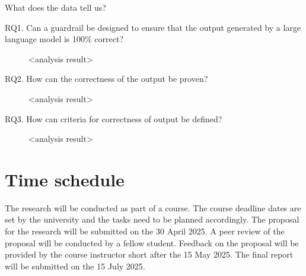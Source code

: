 \documentclass[a4paper,doc,natbib]{apa6}
\begin{document}
    What does the data tell us?

    \begin{description}
        \item[RQ1. Can a guardrail be designed to ensure that the output generated by a large language model is 100\% correct?] <analysis result>
        \item[RQ2. How can the correctness of the output be proven?] <analysis result>
        \item[RQ3. How can criteria for correctness of output be defined?] <analysis result>
    \end{description}

    \section{Time schedule}

    The research will be conducted as part of a course. The course deadline dates are set by the university and the tasks need to be planned accordingly.
    The proposal for the research will be submitted on the 30 April 2025. A peer review of the proposal will be conducted by a fellow student.
    Feedback on the proposal will be provided by the course instructor short after the 15 May 2025.
    The final report will be submitted on the 15 July 2025.

    
\end{document}
